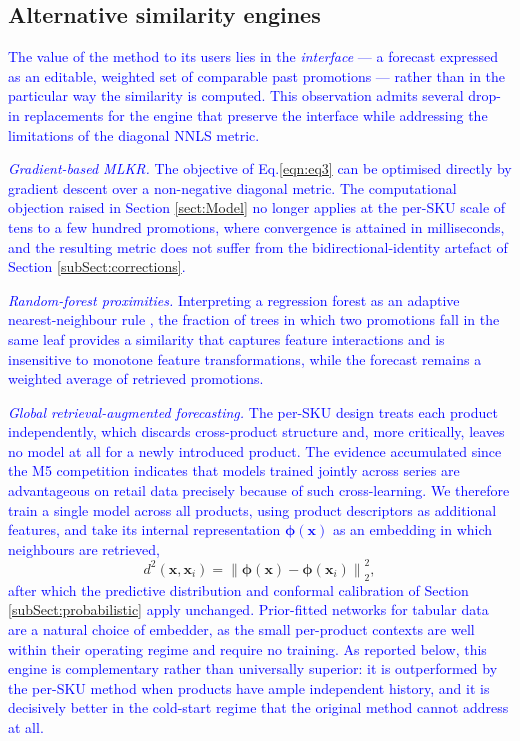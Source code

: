 \documentclass{ieeeaccess}
\newcommand{\myblue}[1]{\textcolor{blue}{#1}}
\newcommand\norm[1]{\left\lVert#1\right\rVert}
\begin{document}
\subsection{Alternative similarity engines} \label{subSect:engines}

\myblue{The value of the method to its users lies in the \emph{interface} --- a
forecast expressed as an editable, weighted set of comparable past promotions
--- rather than in the particular way the similarity is computed. This
observation admits several drop-in replacements for the engine that preserve the
interface while addressing the limitations of the diagonal NNLS metric.}

\myblue{\emph{Gradient-based MLKR.} The objective of Eq.\eqref{eqn:eq3} can be
optimised directly by gradient descent over a non-negative diagonal metric. The
computational objection raised in Section \ref{sect:Model} no longer applies at
the per-SKU scale of tens to a few hundred promotions, where convergence is
attained in milliseconds, and the resulting metric does not suffer from the
bidirectional-identity artefact of Section \ref{subSect:corrections}.}

\myblue{\emph{Random-forest proximities.} Interpreting a regression forest as an
adaptive nearest-neighbour rule \cite{lin2006random}, the fraction of trees in
which two promotions fall in the same leaf provides a similarity that captures
feature interactions and is insensitive to monotone feature transformations,
while the forecast remains a weighted average of retrieved promotions.}

\myblue{\emph{Global retrieval-augmented forecasting.} The per-SKU design treats
each product independently, which discards cross-product structure and, more
critically, leaves no model at all for a newly introduced product. The evidence
accumulated since the M5 competition \cite{makridakis2022m5} indicates that
models trained jointly across series are advantageous on retail data precisely
because of such cross-learning. We therefore train a single model across all
products, using product descriptors as additional features, and take its
internal representation $\boldsymbol{\phi}(\mathbf{x})$ as an embedding in which
neighbours are retrieved,}
\begin{equation}
d^2(\mathbf{x}, \mathbf{x}_i) = \norm{ \boldsymbol{\phi}(\mathbf{x}) - \boldsymbol{\phi}(\mathbf{x}_i) }_2^2 ,
\label{eqn:embedDist}
\end{equation}
\myblue{after which the predictive distribution and conformal calibration of
Section \ref{subSect:probabilistic} apply unchanged. Prior-fitted networks for
tabular data \cite{hollmann2025tabular} are a natural choice of embedder, as the
small per-product contexts are well within their operating regime and require no
training. As reported below, this engine is complementary rather than
universally superior: it is outperformed by the per-SKU method when products
have ample independent history, and it is decisively better in the cold-start
regime that the original method cannot address at all.}
\end{document}
